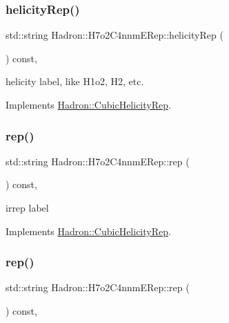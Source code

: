 \subsubsection{\texorpdfstring{helicityRep()}{helicityRep()}\hspace{0.1cm}{\footnotesize\ttfamily [3/3]}}
{\footnotesize\ttfamily std\+::string Hadron\+::\+H7o2\+C4nnm\+E\+Rep\+::helicity\+Rep (\begin{DoxyParamCaption}{ }\end{DoxyParamCaption}) const\hspace{0.3cm}{\ttfamily [inline]}, {\ttfamily [virtual]}}

helicity label, like H1o2, H2, etc. 

Implements \mbox{\hyperlink{structHadron_1_1CubicHelicityRep_af1096946b7470edf0a55451cc662f231}{Hadron\+::\+Cubic\+Helicity\+Rep}}.

\mbox{\label{structHadron_1_1H7o2C4nnmERep_a42e882ae78a0d7fd00653fa44e65f81f}} 
\subsubsection{\texorpdfstring{rep()}{rep()}\hspace{0.1cm}{\footnotesize\ttfamily [1/3]}}
{\footnotesize\ttfamily std\+::string Hadron\+::\+H7o2\+C4nnm\+E\+Rep\+::rep (\begin{DoxyParamCaption}{ }\end{DoxyParamCaption}) const\hspace{0.3cm}{\ttfamily [inline]}, {\ttfamily [virtual]}}

irrep label 

Implements \mbox{\hyperlink{structHadron_1_1CubicHelicityRep_a8cdd86f068a167dc96faef02bfb8a33d}{Hadron\+::\+Cubic\+Helicity\+Rep}}.

\mbox{\label{structHadron_1_1H7o2C4nnmERep_a42e882ae78a0d7fd00653fa44e65f81f}} 
\subsubsection{\texorpdfstring{rep()}{rep()}\hspace{0.1cm}{\footnotesize\ttfamily [2/3]}}
{\footnotesize\ttfamily std\+::string Hadron\+::\+H7o2\+C4nnm\+E\+Rep\+::rep (\begin{DoxyParamCaption}{ }\end{DoxyParamCaption}) const\hspace{0.3cm}{\ttfamily [inline]}, {\ttfamily [virtual]}}

